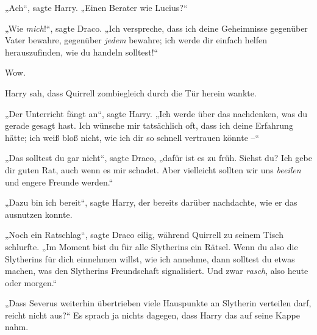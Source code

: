 „Ach“, sagte Harry. „Einen Berater wie Lucius?“

„Wie \emph{mich}!“, sagte Draco. „Ich verspreche, dass ich deine Geheimnisse gegenüber Vater bewahre, gegenüber \emph{jedem} bewahre; ich werde dir einfach helfen herauszufinden, wie du handeln solltest!“

Wow.

Harry sah, dass Quirrell zombiegleich durch die Tür herein wankte.

„Der Unterricht fängt an“, sagte Harry. „Ich werde über das nachdenken, was du gerade gesagt hast. Ich wünsche mir tatsächlich oft, dass ich deine Erfahrung hätte; ich weiß bloß nicht, wie ich dir so schnell vertrauen könnte –“

„Das solltest du gar nicht“, sagte Draco, „dafür ist es zu früh. Siehst du? Ich gebe dir guten Rat, auch wenn es mir schadet. Aber vielleicht sollten wir uns \emph{beeilen} und engere Freunde werden.“

„Dazu bin ich bereit“, sagte Harry, der bereits darüber nachdachte, wie er das ausnutzen konnte.

„Noch ein Ratschlag“, sagte Draco eilig, während Quirrell zu seinem Tisch schlurfte. „Im Moment bist du für alle Slytherins ein Rätsel. Wenn du also die Slytherins für dich einnehmen willst, wie ich annehme, dann solltest du etwas machen, was den Slytherins Freundschaft signalisiert. Und zwar \emph{rasch}, also heute oder morgen.“

„Dass Severus weiterhin übertrieben viele Hauspunkte an Slytherin verteilen darf, reicht nicht aus?“ Es sprach ja nichts dagegen, dass Harry das auf seine Kappe nahm.

